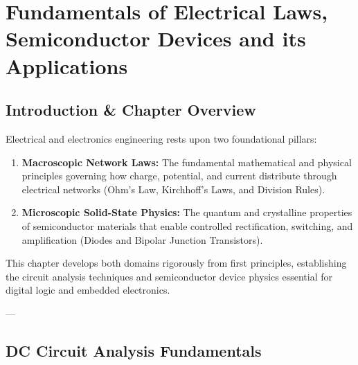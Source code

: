 \chapter{Fundamentals of Electrical Laws, Semiconductor Devices and its Applications}
\label{chap:electrical-laws-semiconductors}

\section{Introduction \& Chapter Overview}
Electrical and electronics engineering rests upon two foundational pillars:
\begin{enumerate}
    \item \textbf{Macroscopic Network Laws:} The fundamental mathematical and physical principles governing how charge, potential, and current distribute through electrical networks (Ohm's Law, Kirchhoff's Laws, and Division Rules).
    \item \textbf{Microscopic Solid-State Physics:} The quantum and crystalline properties of semiconductor materials that enable controlled rectification, switching, and amplification (Diodes and Bipolar Junction Transistors).
\end{enumerate}

\noindent This chapter develops both domains rigorously from first principles, establishing the circuit analysis techniques and semiconductor device physics essential for digital logic and embedded electronics.

---

\section{DC Circuit Analysis Fundamentals}

